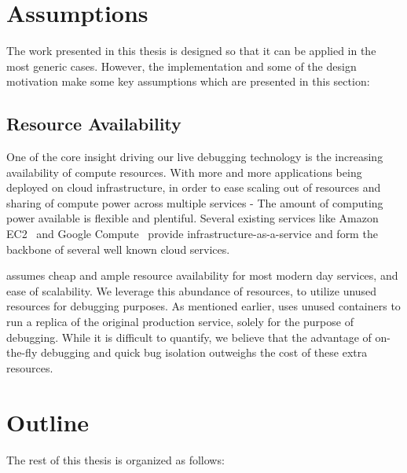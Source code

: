 \fi

\section{Assumptions}
\label{sec:introAssumptions}

The work presented in this thesis is designed so that it can be applied in the most generic cases. 
However, the implementation and some of the design motivation make some key assumptions which are presented in this section:

\subsection{Resource Availability}
One of the core insight driving our live debugging technology is the increasing availability of compute resources. 
With more and more applications being deployed on cloud infrastructure, in order to ease scaling out of resources and sharing of compute power across multiple services - The amount of computing power available is flexible and plentiful.
Several existing services like Amazon EC2~\cite{ec2} and Google Compute~\cite{gcompute} provide infrastructure-as-a-service and form the backbone of several well known cloud services. 

\parikshan assumes cheap and ample resource availability for most modern day services, and ease of scalability. We leverage this abundance of resources, to utilize unused resources for debugging purposes.
As mentioned earlier, \parikshan uses unused containers to run a replica of the original production service, solely for the purpose of debugging.
While it is difficult to quantify, we believe that the advantage of on-the-fly debugging and quick bug isolation outweighs the cost of these extra resources. 

\section{Outline}
\label{sec:introOutline}

The rest of this thesis is organized as follows:

